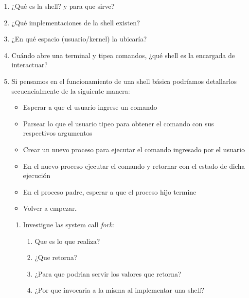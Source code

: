 \begin{enumerate}
\item \question ¿Qué es la shell? y para que sirve?

\item \question ¿Qué implementaciones de la shell existen?

\item \question ¿En qué espacio (usuario/kernel) la ubicaría?

\item \question Cuándo abre una terminal y tipea comandos, ¿qué shell es la encargada de interactuar?
 
\item Si pensamos en el funcionamiento de una shell básica podríamos detallarlos secuencialmente de la siguiente manera:
	\begin{itemize}
		   \item Esperar a que el usuario ingrese un comando

	              \item Parsear lo que el usuario tipeo para obtener el comando con sus respectivos argumentos

           	   \item Crear un nuevo proceso para ejecutar el comando ingresado por el usuario

	              \item En el nuevo proceso ejecutar el comando y retornar con el estado de dicha ejecución

           	   \item En el proceso padre, esperar a que el proceso hijo termine

		   \item Volver a empezar.
   	\end{itemize}

    	\begin{enumerate}
		\item Investigue las system call \textit{fork}:
		        \begin{enumerate}
				\item \question Que es lo que realiza?
				\item \question ¿Que retorna?
				\item \question ¿Para que podrian servir los valores que retorna?
				\item \question ¿Por que invocaria a la misma al implementar una shell?
	                    \end{enumerate}


\end{enumerate}
\end{enumerate}
